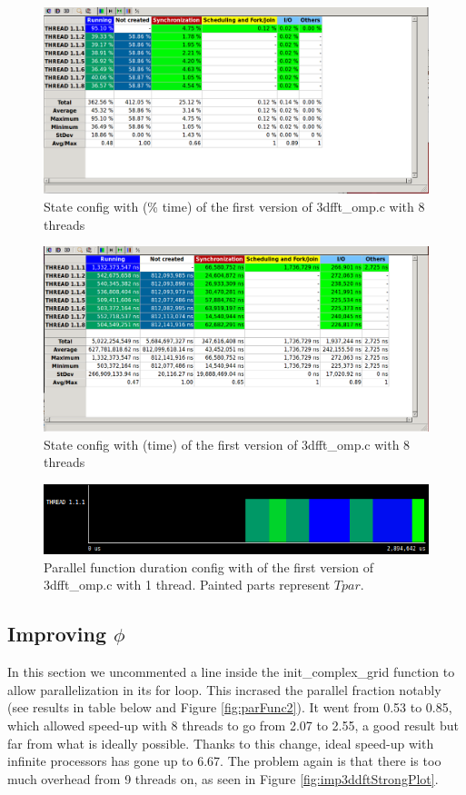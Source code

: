 \documentclass[12]{article}
\begin{document}
\begin{figure}[H]
\centering  
\includegraphics[scale=0.5]{images/3dfft/8threadsPercentage.PNG}
    \caption{State config with (\% time) of the first version of 3dfft\_omp.c with 8 threads}
\end{figure}

\begin{figure}[H]
\centering  
\includegraphics[scale=0.5]{images/3dfft/8threads.PNG}
    \caption{State config with (time) of the first version of 3dfft\_omp.c with 8 threads}
\end{figure}

\begin{figure}[H]
\centering  
\includegraphics[scale=0.5]{images/3dfft/parallelFunction.PNG}
    \caption{Parallel function duration config with of the first version of 3dfft\_omp.c with 1 thread. Painted parts represent $T{par}$.}
\end{figure}
        

\subsection{Improving $\phi$}
In this section we uncommented a line inside the init\_complex\_grid function to allow parallelization in its for loop. This incrased the parallel fraction notably (see results in table below and Figure \ref{fig:parFunc2}). It went from 0.53 to 0.85, which allowed speed-up with 8 threads to go from 2.07 to 2.55, a good result but far from what is ideally possible. Thanks to this change, ideal speed-up with infinite processors has gone up to 6.67. The problem again is that there is too much overhead from 9 threads on, as seen in Figure \ref{fig:imp3ddftStrongPlot}.
\end{document}
